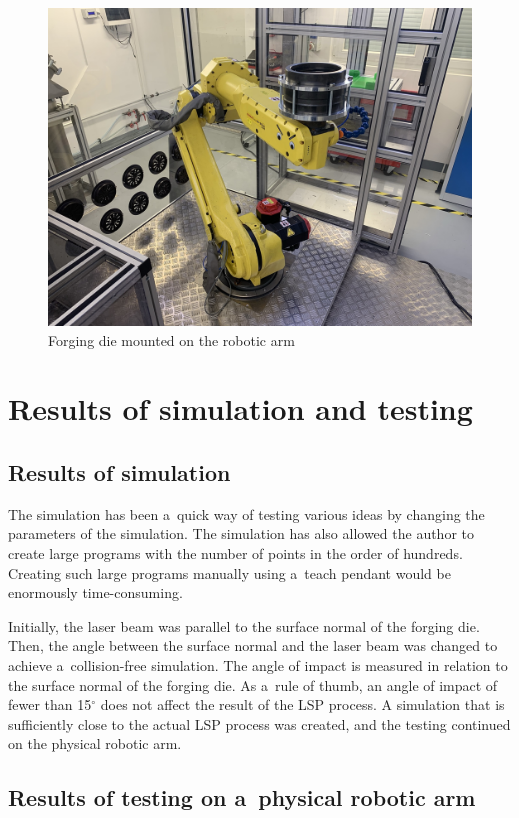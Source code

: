 \begin{figure}[h!]
    \centering
    \includegraphics[width=0.9\linewidth]{img/cast.jpeg}
    \caption{Forging die mounted on the robotic arm}
    \label{fig:cast}
\end{figure}

\section{Results of simulation and testing}

\subsection{Results of simulation}

The simulation has been a~quick way of testing various ideas by changing the parameters of the simulation. The simulation has also allowed the author to create large programs with the number of points in the order of hundreds. Creating such large programs manually using a~teach pendant would be enormously time-consuming. 

Initially, the laser beam was parallel to the surface normal of the forging die. Then, the angle between the surface normal and the laser beam was changed to achieve a~collision-free simulation. The angle of impact is measured in relation to the surface normal of the forging die. As a~rule of thumb, an angle of impact of fewer than 15$^{\circ}$ does not affect the result of the LSP process.  A simulation that is sufficiently close to the actual LSP process was created, and the testing continued on the physical robotic arm.

\subsection{Results of testing on a~physical robotic arm}

